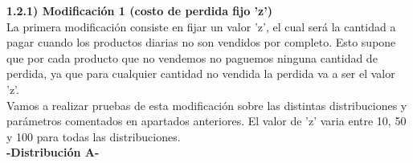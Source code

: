 \documentclass{article}
\begin{document}
	
	\normalsize \textbf{1.2.1) Modificación 1 (costo de perdida fijo 'z')} \\
	
	La primera modificación consiste en fijar un valor 'z', el cual será la cantidad a pagar cuando los productos diarias no son vendidos por completo. Esto supone que por cada producto que no vendemos no paguemos ninguna cantidad de perdida, ya que para cualquier cantidad no vendida la perdida va a ser el valor 'z'. \\
	
	Vamos a realizar pruebas de esta modificación sobre las distintas distribuciones y parámetros comentados en apartados anteriores. El valor de 'z' varia entre 10, 50 y 100 para todas las distribuciones. \\
	

	\textbf{-Distribución A-}
\end{document}
